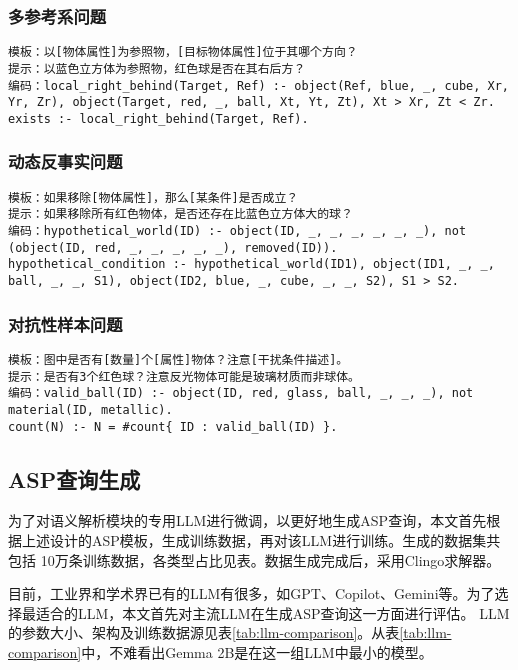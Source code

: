 \subsubsection{多参考系问题}
\begin{lstlisting}
模板：以[物体属性]为参照物，[目标物体属性]位于其哪个方向？
提示：以蓝色立方体为参照物，红色球是否在其右后方？
编码：local_right_behind(Target, Ref) :- object(Ref, blue, _, cube, Xr, Yr, Zr), object(Target, red, _, ball, Xt, Yt, Zt), Xt > Xr, Zt < Zr.
exists :- local_right_behind(Target, Ref).
\end{lstlisting}
\subsubsection{动态反事实问题}
\begin{lstlisting}
模板：如果移除[物体属性]，那么[某条件]是否成立？
提示：如果移除所有红色物体，是否还存在比蓝色立方体大的球？
编码：hypothetical_world(ID) :- object(ID, _, _, _, _, _, _), not (object(ID, red, _, _, _, _, _), removed(ID)).
hypothetical_condition :- hypothetical_world(ID1), object(ID1, _, _, ball, _, _, S1), object(ID2, blue, _, cube, _, _, S2), S1 > S2.
\end{lstlisting}
\subsubsection{对抗性样本问题}
\begin{lstlisting}
模板：图中是否有[数量]个[属性]物体？注意[干扰条件描述]。
提示：是否有3个红色球？注意反光物体可能是玻璃材质而非球体。
编码：valid_ball(ID) :- object(ID, red, glass, ball, _, _, _), not material(ID, metallic). 
count(N) :- N = #count{ ID : valid_ball(ID) }.
\end{lstlisting}

\subsection{ASP查询生成}
为了对语义解析模块的专用LLM进行微调，以更好地生成ASP查询，本文首先根据上述设计的ASP模板，生成训练数据，再对该LLM进行训练。生成的数据集共包括
10万条训练数据，各类型占比见表。数据生成完成后，采用Clingo求解器。

目前，工业界和学术界已有的LLM有很多，如GPT、Copilot、Gemini等。为了选择最适合的LLM，本文首先对主流LLM在生成ASP查询这一方面进行评估。
LLM的参数大小、架构及训练数据源见表\ref{tab:llm-comparison}。从表\ref{tab:llm-comparison}中，不难看出Gemma 2B是在这一组LLM中最小的模型。

